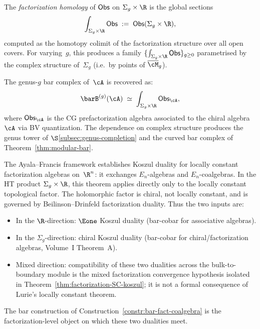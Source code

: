 \begin{construction}
\label{constr:fact-homology-genus}
The \emph{factorization homology} of $\mathsf{Obs}$ on $\Sigma_g \times \R$ is
the global sections
\begin{equation}\label{eq:fact-homology}
 \int_{\Sigma_g \times \R} \Obs
 \;:=\;
 \Obs(\Sigma_g \times \R),
\end{equation}
computed as the homotopy colimit of the factorization structure over
all open covers. For varying~$g$, this produces a family
$\{\int_{\Sigma_g \times \R} \Obs\}_{g \geq 0}$ parametrised by the
complex structure of~$\Sigma_g$ (i.e.\ by points of $\Mbar_g$).

The genus-$g$ bar complex of~$\cA$ is recovered as:
\[
 \barB^{(g)}(\cA)
 \;\simeq\;
 \int_{\Sigma_g \times \R} \Obs_\cA,
\]
where $\Obs_\cA$ is the CG prefactorization algebra associated to the
chiral algebra~$\cA$ via BV quantization. The dependence on complex
structure produces the genus tower of
$\S$\ref{subsec:genus-completion} and the curved bar complex of
Theorem~\ref{thm:modular-bar}.
\end{construction}

\begin{remark}
\label{rem:CG-koszul}
The Ayala--Francis framework \cite{AF15} establishes Koszul duality
for locally constant factorization algebras on~$\R^n$: it exchanges
$E_n$-algebras and $E_n$-coalgebras. In the HT product
$\Sigma_g \times \R$, this theorem applies directly only to the
locally constant topological factor. The holomorphic factor is
chiral, not locally constant, and is governed by Beilinson--Drinfeld
factorization duality. Thus the two inputs are:
\begin{itemize}
\item In the $\R$-direction: $\Eone$ Koszul duality (bar-cobar for
 associative algebras).
\item In the $\Sigma_g$-direction: chiral Koszul duality
 (bar-cobar for chiral/factorization algebras, Volume~I
 Theorem~A).
\item Mixed direction: compatibility of these two dualities across
 the bulk-to-boundary module is the mixed factorization convergence
 hypothesis isolated in Theorem~\ref{thm:factorization-SC-koszul};
 it is not a formal consequence of Lurie's locally constant theorem.
\end{itemize}
The bar construction of Construction~\ref{constr:bar-fact-coalgebra}
is the factorization-level object on which these two dualities meet.
\end{remark}


